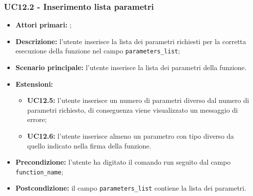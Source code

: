 \subsubsection{UC12.2 - Inserimento lista parametri}
\begin{itemize}
	\item \textbf{Attori primari:} \ua{};
	\item \textbf{Descrizione:} l’utente inserisce la lista dei parametri richiesti per la corretta esecuzione della funzione nel campo \texttt{parameters\_list};
	\item \textbf{Scenario principale:}  l'utente inserisce la lista dei parametri della funzione. 
	\item \textbf{Estensioni:} 
	\begin{itemize}
		\item \textbf{UC12.5:}  l’utente inserisce un numero di parametri diverso dal numero di parametri richiesto, di conseguenza viene visualizzato un messaggio di errore; 
		\item \textbf{UC12.6:} l'utente inserisce almeno un parametro con tipo diverso da quello indicato nella firma della funzione.
	\end{itemize}
	\item \textbf{Precondizione:} l’utente ha digitato il comando run seguito dal campo \texttt{function\_name};
	\item \textbf{Postcondizione:} il campo \texttt{parameters\_list} contiene la lista dei parametri.
\end{itemize}